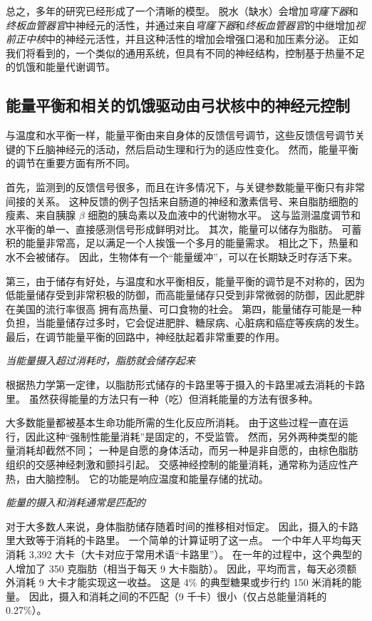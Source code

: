 总之，多年的研究已经形成了一个清晰的模型。
脱水（缺水）会增加\textit{穹窿下器}和\textit{终板血管器官}中神经元的活性，并通过来自\textit{穹窿下器}和\textit{终板血管器官}的中继增加\textit{视前正中核}中的神经元活性，并且这种活性的增加会增强口渴和加压素分泌。
正如我们将看到的，一个类似的通用系统，但具有不同的神经结构，控制基于热量不足的饥饿和能量代谢调节。



\subsection{能量平衡和相关的饥饿驱动由弓状核中的神经元控制}

与温度和水平衡一样，能量平衡由来自身体的反馈信号调节，这些反馈信号调节关键的下丘脑神经元的活动，然后启动生理和行为的适应性变化。
然而，能量平衡的调节在重要方面有所不同。


首先，监测到的反馈信号很多，而且在许多情况下，与关键参数能量平衡只有非常间接的关系。
这种反馈的例子包括来自肠道的神经和激素信号、来自脂肪细胞的瘦素、来自胰腺 $ \beta $ 细胞的胰岛素以及血液中的代谢物水平。
这与监测温度调节和水平衡的单一、直接感测信号形成鲜明对比。
其次，能量可以储存为脂肪。
可蓄积的能量非常高，足以满足一个人挨饿一个多月的能量需求。 相比之下，热量和水不会被储存。
因此，生物体有一个“能量缓冲”，可以在长期缺乏时存活下来。


第三，由于储存有好处，与温度和水平衡相反，能量平衡的调节是不对称的，因为低能量储存受到非常积极的防御，而高能量储存只受到非常微弱的防御，因此肥胖在美国的流行率很高 拥有高热量、可口食物的社会。
第四，能量储存可能是一种负担，当能量储存过多时，它会促进肥胖、糖尿病、心脏病和癌症等疾病的发生。
最后，在调节能量平衡的回路中，神经肽起着非常重要的作用。


\textit{当能量摄入超过消耗时，脂肪就会储存起来}

根据热力学第一定律，以脂肪形式储存的卡路里等于摄入的卡路里减去消耗的卡路里。
虽然获得能量的方法只有一种（吃）但消耗能量的方法有很多种。


大多数能量都被基本生命功能所需的生化反应所消耗。
由于这些过程一直在运行，因此这种“强制性能量消耗”是固定的，不受监管。
然而，另外两种类型的能量消耗却截然不同；
一种是自愿的身体活动，而另一种是非自愿的，由棕色脂肪组织的交感神经刺激和颤抖引起。
交感神经控制的能量消耗，通常称为适应性产热，由大脑控制。
它的功能是响应温度和能量存储的扰动。


\textit{能量的摄入和消耗通常是匹配的}

对于大多数人来说，身体脂肪储存随着时间的推移相对恒定。
因此，摄入的卡路里大致等于消耗的卡路里。 一个简单的计算证明了这一点。
一个中年人平均每天消耗 3,392 大卡（大卡对应于常用术语“卡路里”）。
在一年的过程中，这个典型的人增加了 350 克脂肪（相当于每天 9 大卡脂肪）。
因此，平均而言，每天必须额外消耗 9 大卡才能实现这一收益。
这是 4\% 的典型糖果或步行约 150 米消耗的能量。
因此，摄入和消耗之间的不匹配（9 千卡）很小（仅占总能量消耗的 0.27\%）。


